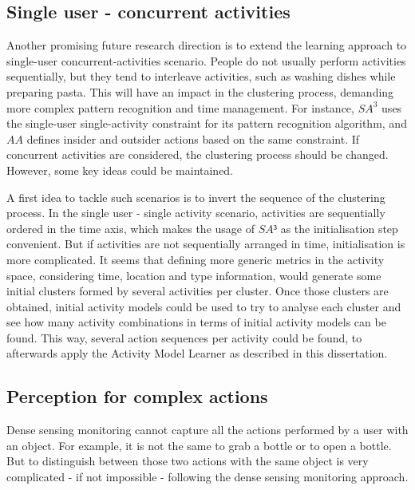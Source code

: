 \subsection{Single user - concurrent activities}

Another promising future research direction is to extend the learning approach to single-user concurrent-activities scenario. People do not usually perform activities sequentially, but they tend to interleave activities, such as washing dishes while preparing pasta. This will have an impact in the clustering process, demanding more complex pattern recognition and time management. For instance, $SA^3$ uses the single-user single-activity constraint for its pattern recognition algorithm, and $AA$ defines insider and outsider actions based on the same constraint. If concurrent activities are considered, the clustering process should be changed. However, some key ideas could be maintained. 

A first idea to tackle such scenarios is to invert the sequence of the clustering process. In the single user - single activity scenario, activities are sequentially ordered in the time axis, which makes the usage of $SA³$ as the initialisation step convenient. But if activities are not sequentially arranged in time, initialisation is more complicated. It seems that defining more generic metrics in the activity space, considering time, location and type information, would generate some initial clusters formed by several activities per cluster. Once those clusters are obtained, initial activity models could be used to try to analyse each cluster and see how many activity combinations in terms of initial activity models can be found. This way, several action sequences per activity could be found, to afterwards apply the Activity Model Learner as described in this dissertation.

\subsection{Perception for complex actions}

Dense sensing monitoring cannot capture all the actions performed by a user with an object. For example, it is not the same to grab a bottle or to open a bottle. But to distinguish between those two actions with the same object is very complicated - if not impossible - following the dense sensing monitoring approach.


